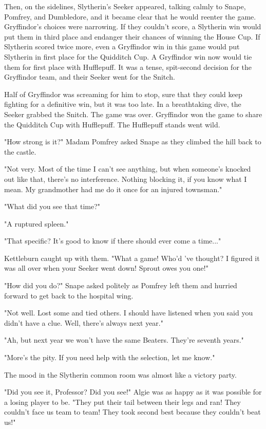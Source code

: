 \documentclass[a4paper,11pt]{article}
\begin{document}
Then, on the sidelines, Slytherin's Seeker appeared, talking calmly to Snape, Pomfrey, and Dumbledore, and it became clear that he would reenter the game. Gryffindor's choices were narrowing. If they couldn't score, a Slytherin win would put them in third place and endanger their chances of winning the House Cup. If Slytherin scored twice more, even a Gryffindor win in this game would put Slytherin in first place for the Quidditch Cup. A Gryffindor win now would tie them for first place with Hufflepuff. It was a tense, spit-second decision for the Gryffindor team, and their Seeker went for the Snitch.

Half of Gryffindor was screaming for him to stop, sure that they could keep fighting for a definitive win, but it was too late. In a breathtaking dive, the Seeker grabbed the Snitch. The game was over. Gryffindor won the game to share the Quidditch Cup with Hufflepuff. The Hufflepuff stands went wild.

"How strong is it?" Madam Pomfrey asked Snape as they climbed the hill back to the castle.

"Not very. Most of the time I can't see anything, but when someone's knocked out like that, there's no interference. Nothing blocking it, if you know what I mean. My grandmother had me do it once for an injured townsman."

"What did you see that time?"

"A ruptured spleen."

"That specific? It's good to know if there should ever come a time..."

Kettleburn caught up with them. "What a game! Who'd 've thought? I figured it was all over when your Seeker went down! Sprout owes you one!"

"How did you do?" Snape asked politely as Pomfrey left them and hurried forward to get back to the hospital wing.

"Not well. Lost some and tied others. I should have listened when you said you didn't have a clue. Well, there's always next year."

"Ah, but next year we won't have the same Beaters. They're seventh years."

"More's the pity. If you need help with the selection, let me know."

The mood in the Slytherin common room was almost like a victory party.

"Did you see it, Professor? Did you see!" Algie was as happy as it was possible for a losing player to be. "They put their tail between their legs and ran! They couldn't face us team to team! They took second best because they couldn't beat us!"
\end{document}
